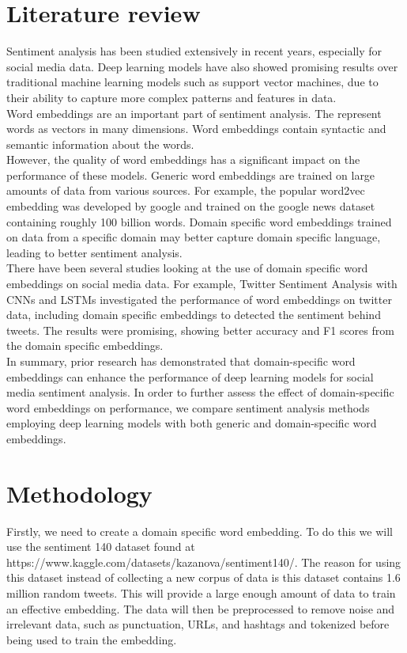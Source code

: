 \documentclass[10pt,journal]{IEEEtran}
\begin{document}
\section{Literature review}
Sentiment analysis has been studied extensively in recent years, especially for social media data. Deep learning models have also showed promising results over traditional machine learning models such as support vector machines, due to their ability to capture more complex patterns and features in data.
\cite{chandra_jana_2020}
\\Word embeddings are an important part of sentiment analysis. The represent words as vectors in many dimensions.\cite{word embeddings in nlp: a complete guide} Word embeddings contain syntactic and semantic information about the words.
\\However, the quality of word embeddings has a significant impact on the performance of these models. Generic word embeddings are trained on large amounts of data from various sources. For example, the popular word2vec embedding was developed by google and trained on the google news dataset containing roughly 100 billion words.\cite{pai_2020} Domain specific word embeddings trained on data from a specific domain may better capture domain specific language, leading to better sentiment analysis.
\\There have been several studies looking at the use of domain specific word embeddings on social media data. For example, Twitter Sentiment Analysis with CNNs and LSTMs\cite{cliche_2017} investigated the performance of word embeddings on twitter data, including domain specific embeddings to detected the sentiment behind tweets. The results were promising, showing better  accuracy and F1 scores from the domain specific embeddings.
\\In summary, prior research has demonstrated that domain-specific word embeddings can enhance the performance of deep learning models for social media sentiment analysis. In order to further assess the effect of domain-specific word embeddings on performance, we compare sentiment analysis methods employing deep learning models with both generic and domain-specific word embeddings.

\section{Methodology}
Firstly, we need to create a domain specific word embedding. To do this we will use the sentiment 140 dataset \cite{kazanova} found at https://www.kaggle.com/datasets/kazanova/sentiment140/. The reason for using this dataset instead of collecting a new corpus of data is this dataset contains 1.6 million random tweets. This will provide a large enough amount of data to train an effective embedding. The data will then be preprocessed to remove noise and irrelevant data, such as punctuation, URLs, and hashtags and tokenized before being used to train the embedding.
\end{document}
